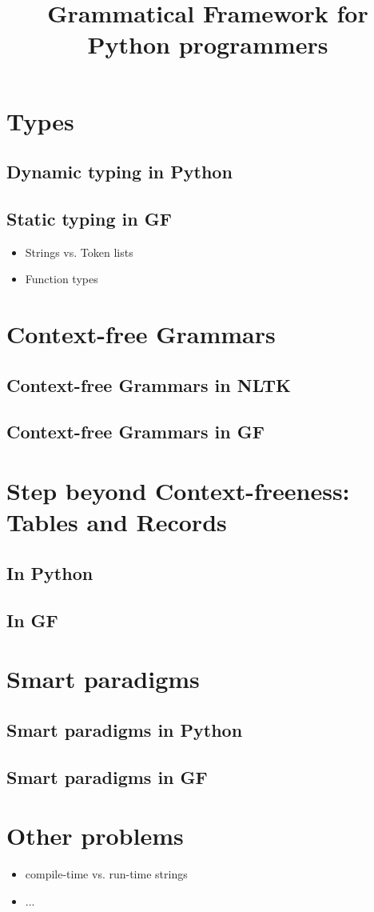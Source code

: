 \documentclass{scrartcl}
\title{Grammatical Framework for Python programmers}
\begin{document}
\section{Types}
\subsection{Dynamic typing in Python}
\subsection{Static typing in GF}
\begin{itemize}
\item Strings vs. Token lists
\item Function types
\end{itemize}
\section{Context-free Grammars}
\subsection{Context-free Grammars in NLTK}
\subsection{Context-free Grammars in GF}
\section{Step beyond Context-freeness: Tables and Records}
\subsection{In Python}
\subsection{In GF}
\section{Smart paradigms}
\subsection{Smart paradigms in Python}
\subsection{Smart paradigms in GF}
\section{Other problems}
\begin{itemize}
\item compile-time vs. run-time strings
\item ...
\end{itemize}
\end{document}
